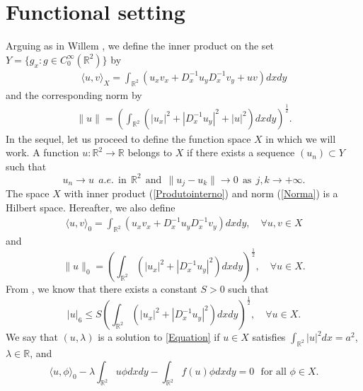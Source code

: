 \documentclass[11pt]{amsart}
\numberwithin{equation}{section}
\begin{document}
{{{\section{Functional setting}\label{sec2}
Arguing as in Willem \cite[Chapter 7]{Willem}, we define the inner product on the set $Y=\{ g_x : g \in C^{\infty}_0 (\mathbb{R}^{2}) \}$ by
\begin{eqnarray}\label{Produtointerno}
    \langle u,v\rangle_X= \displaystyle\int_{\mathbb{R}^{2}} \left(u_x v_x + D^{-1}_{x} u_{y} D^{-1}_{x} v_{y} + u v\right)dx dy
\end{eqnarray}
and the corresponding norm by
\begin{eqnarray}\label{Norma}
    \|u\|= \left( \displaystyle\int_{\mathbb{R}^{2}} \left(|u_{x}|^{2} + |D^{-1}_{x} u_{y}|^{2} + |u|^{2}\right)dx dy\right)^{\frac{1}{2}}.
\end{eqnarray}
In the sequel, let us proceed to define the function space $X$ in which  we will work. A function $u:\mathbb{R}^{2}\to\mathbb{R}$ belongs to $X$ if there exists a sequence $(u_n) \subset Y$ such that
$$
u_n \to u \ \  a.e. \ \ \text{in}\ \ \mathbb{R}^{2} \ \ \mbox{and} \ \ \|u_j -u_k\|\to 0 \ \ \mbox{as} \ \ j, k \to +\infty.
$$
The space $X$ with inner product (\ref{Produtointerno}) and norm (\ref{Norma}) is a Hilbert space.
Hereafter, we also define
\begin{eqnarray}\label{Produtointerno0}
    \langle u,v \rangle_0= \displaystyle\int_{\mathbb{R}^{2}} \left(u_x v_x + D^{-1}_{x} u_{y} D^{-1}_{x} v_{y}\right)dx dy, \quad \forall u,v \in X
\end{eqnarray}
and
\begin{equation}\label{Norma0}
    \|u\|_0=  \left(\displaystyle\int_{\mathbb{R}^{2}} \left(|u_{x}|^{2} + |D^{-1}_{x} u_{y}|^{2} \right)dx dy\right)^{\frac{1}{2}}, \quad \forall u \in X.
\end{equation}
From \cite[Lemma 2.2]{Xu} , we know that  there exists a constant $S>0$ such that
\begin{equation} \label{S}
    |u|_6 \leq S\left(\int_{\mathbb{R}^2}\left(\left|u_x\right|^2+\left|D_x^{-1} u_y \right|^2\right) d xdy\right)^{\frac{1}{2}}, \quad \forall u \in X.
\end{equation}
We say that $(u, \lambda)$ is a solution  to \eqref{Equation} if $u \in X$ satisfies $\displaystyle \int_{\mathbb{R}^{2}}|u|^{2}dx=a^{2}$, $\lambda\in \mathbb{R}$, and
$$
\langle u,\phi\rangle_0 -\lambda\int_{\mathbb{R}^{2}}u\phi dx dy- \displaystyle\int_{\mathbb{R}^{2}} f(u)\phi dx dy = 0  \,\,\,\, \mbox{for all} \,\,  \phi\in X.
$$}}}
\end{document}
